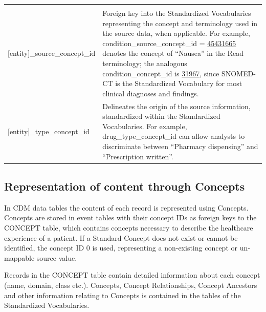 \documentclass[11pt]{book}
\theoremstyle{definition}
\theoremstyle{definition}
\theoremstyle{definition}
\theoremstyle{remark}
\begin{document}
\begin{longtable}[]{@{}ll@{}}
\begin{minipage}[t]{0.61\columnwidth}
\end{minipage}\tabularnewline
\begin{minipage}[t]{0.34\columnwidth}\raggedright
{[}entity{]}\_source\_concept\_id\strut
\end{minipage} & \begin{minipage}[t]{0.61\columnwidth}\raggedright
Foreign key into the Standardized Vocabularies representing the concept and terminology used in the source data, when applicable. For example, condition\_source\_concept\_id = \href{http://athena.ohdsi.org/search-terms/terms/45431665}{45431665} denotes the concept of ``Nausea'' in the Read terminology; the analogous condition\_concept\_id is \href{http://athena.ohdsi.org/search-terms/terms/31967}{31967}, since SNOMED-CT is the Standardized Vocabulary for most clinical diagnoses and findings.\strut
\end{minipage}\tabularnewline
\begin{minipage}[t]{0.34\columnwidth}\raggedright
{[}entity{]}\_type\_concept\_id\strut
\end{minipage} & \begin{minipage}[t]{0.61\columnwidth}\raggedright
Delineates the origin of the source information, standardized within the Standardized Vocabularies. For example, drug\_type\_concept\_id can allow analysts to discriminate between ``Pharmacy dispensing'' and ``Prescription written''.\strut
\end{minipage}\tabularnewline
\bottomrule
\end{longtable}

\hypertarget{representation-of-content-through-concepts}{%
\subsection{Representation of content through Concepts}\label{representation-of-content-through-concepts}}

In CDM data tables the content of each record is represented using Concepts. Concepts are stored in event tables with their concept IDs as foreign keys to the CONCEPT table, which contains concepts necessary to describe the healthcare experience of a patient. If a Standard Concept does not exist or cannot be identified, the concept ID 0 is used, representing a non-existing concept or un-mappable source value.

Records in the CONCEPT table contain detailed information about each concept (name, domain, class etc.). Concepts, Concept Relationships, Concept Ancestors and other information relating to Concepts is contained in the tables of the Standardized Vocabularies.
\end{document}
